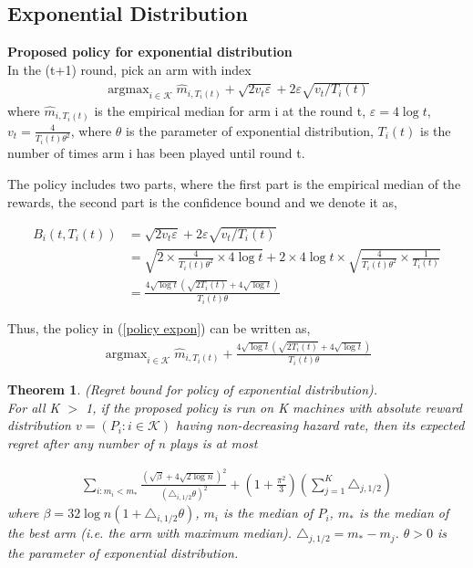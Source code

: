 \documentclass{article}
\DeclareMathOperator*{\argmax}{argmax}
\theoremstyle{plain}
\newtheorem{theo}{Theorem}
\begin{document}
\subsection{Exponential Distribution}

\textbf{Proposed policy for exponential distribution}\\

In the (t+1) round, pick an arm with index
\begin{align}
   \label{policy expon}
   \argmax_{i \in \mathcal{K}} \hat{m}_{i, T_i(t)} + \sqrt{2v_t \varepsilon} + 2 \varepsilon \sqrt{v_t/T_i(t)}
\end{align}
where $\hat{m}_{i, T_i(t)}$ is the empirical median for arm i at the round t, $\varepsilon = 4 \log t$, $v_t = \frac{4 }{T_i(t) \theta^2}$, where $\theta$ is the parameter of exponential distribution, $T_i(t)$ is the number of times arm i has been played until round t.

The policy includes two parts, where the first part is the empirical median of the rewards, the second part is the confidence bound and we denote it as,

\begin{align}
B_i(t, T_i(t)) &= \sqrt{2v_t \varepsilon} + 2 \varepsilon \sqrt{v_t/T_i(t)}\\
&= \sqrt{2 \times \frac{4 }{T_i(t) \theta^2} \times 4 \log t} + 2 \times 4 \log t \times \sqrt{\frac{4 }{T_i(t) \theta^2} \times \frac{1}{T_i(t)}}\\
&= \frac{4 \sqrt{\log t} ( \sqrt{ 2T_i(t)} + 4\sqrt{\log t})}{T_i(t) \theta}
\end{align}

Thus, the policy in (\ref{policy expon}) can be written as,
\begin{align}
    \argmax_{i \in \mathcal{K}} \hat{m}_{i, T_i(t)} +  \frac{4 \sqrt{\log t} ( \sqrt{ 2T_i(t)} + 4\sqrt{\log t})}{T_i(t) \theta}
\end{align}

\begin{theo}
(Regret bound for policy of exponential distribution). \\

For all K $>$ 1, if the proposed policy is run on K machines with absolute reward distribution $v = (P_i: i \in \mathcal{K})$ having non-decreasing hazard rate, then its expected regret after any number of n plays is at most

\begin{align}
    \sum_{i: m_i < m_\ast} \frac{(\sqrt{\beta} + 4\sqrt{2\log n})^2}{ (\triangle_{i, 1/2} \theta)^2} + (1 + \frac{\pi^2}{3}) (\sum_{j=1}^K \triangle_{j, 1/2})
\end{align}
where $\beta = 32 \log n (1 + \triangle_{i, 1/2} \theta)$, $m_i$ is the median of $P_i$, $m_\ast$ is the median of the best arm (i.e. the arm with maximum median). $\triangle_{j, 1/2} = m_\ast - m_j$. $\theta > 0$ is the parameter of exponential distribution.
\end{theo}
\end{document}
